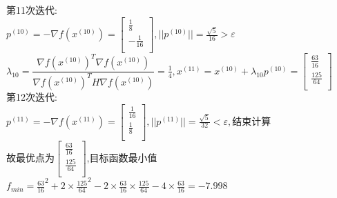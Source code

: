 \begin{solution}
    第11次迭代:\\
    $p^{(10)}=-\nabla f(x^{(10)})=\begin{bmatrix} \frac{1}{8}\\-\frac{1}{16}\\\end{bmatrix},||p^{(10)}||=\frac{\sqrt{5}}{16}>\varepsilon$\\
    $\lambda_{10}=\dfrac{\nabla f(x^{(10)})^T\nabla f(x^{(10)})}{\nabla f(x^{(10)})^TH\nabla f(x^{(10)})}=\frac{1}{4},x^{(11)}=x^{(10)}+\lambda_{10}p^{(10)}=\begin{bmatrix} \frac{63}{16}\\\frac{125}{64}\\\end{bmatrix}$\\
    第12次迭代:\\
    $p^{(11)}=-\nabla f(x^{(11)})=\begin{bmatrix} \frac{1}{16}\\\frac{1}{8}\\\end{bmatrix},||p^{(11)}||=\frac{\sqrt{5}}{32}<\varepsilon,\text{结束计算}$\\
    故最优点为$\begin{bmatrix} \frac{63}{16}\\\frac{125}{64}\\\end{bmatrix}$,目标函数最小值$f_{min}=\frac{63}{16}^2+2\times\frac{125}{64}^2-2\times\frac{63}{16}\times\frac{125}{64}-4\times\frac{63}{16}=-7.998$
\end{solution}

